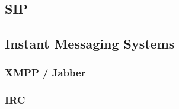 \subsection{SIP}

\subsection{Instant Messaging Systems}
\subsubsection{XMPP / Jabber}
\subsubsection{IRC}

%
%
%
%



